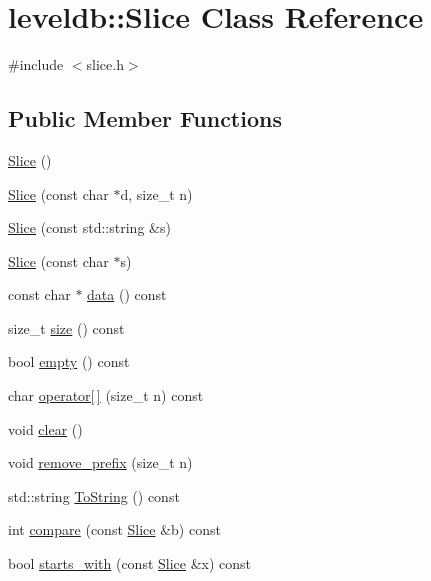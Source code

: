\hypertarget{classleveldb_1_1_slice}{\section{leveldb\-:\-:Slice Class Reference}
\label{classleveldb_1_1_slice}
}


{\ttfamily \#include $<$slice.\-h$>$}

\subsection*{Public Member Functions}
\begin{DoxyCompactItemize}
\item 
\hyperlink{classleveldb_1_1_slice_a5a57e9733fb783aceec1aecfe068ad85}{Slice} ()
\item 
\hyperlink{classleveldb_1_1_slice_ae77bd1d4353bd94d768474d467657c85}{Slice} (const char $\ast$d, size\-\_\-t n)
\item 
\hyperlink{classleveldb_1_1_slice_ab79b60f33aa094179fe36880bc220853}{Slice} (const std\-::string \&s)
\item 
\hyperlink{classleveldb_1_1_slice_a429c530560405fe1a7cd745f7afecf5a}{Slice} (const char $\ast$s)
\item 
const char $\ast$ \hyperlink{classleveldb_1_1_slice_aa64861043d9deee6889461bf0593cf73}{data} () const 
\item 
size\-\_\-t \hyperlink{classleveldb_1_1_slice_a947d3173f04f8a30553e89046daf91d5}{size} () const 
\item 
bool \hyperlink{classleveldb_1_1_slice_a7d0b93d5801bff5656068647759dcb8f}{empty} () const 
\item 
char \hyperlink{classleveldb_1_1_slice_aee7728645cecb259e9804b3b058a40dd}{operator\mbox{[}$\,$\mbox{]}} (size\-\_\-t n) const 
\item 
void \hyperlink{classleveldb_1_1_slice_ab9b6e340e8a483a5cf713f6be17709e3}{clear} ()
\item 
void \hyperlink{classleveldb_1_1_slice_a1be5b22958a115ebecb2b017aad2b3f6}{remove\-\_\-prefix} (size\-\_\-t n)
\item 
std\-::string \hyperlink{classleveldb_1_1_slice_a2cdd9fb649105033fde510afc9416732}{To\-String} () const 
\item 
int \hyperlink{classleveldb_1_1_slice_add751a5852d57a6d0697c85c1e0f3c94}{compare} (const \hyperlink{classleveldb_1_1_slice}{Slice} \&b) const 
\item 
bool \hyperlink{classleveldb_1_1_slice_aac9a3ee9b05567c8c93793e7593a5f13}{starts\-\_\-with} (const \hyperlink{classleveldb_1_1_slice}{Slice} \&x) const 
\end{DoxyCompactItemize}
